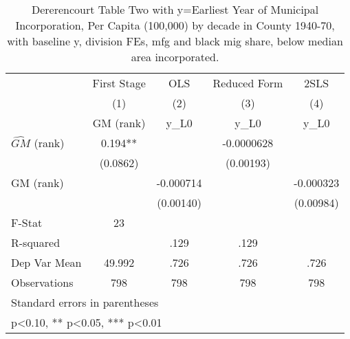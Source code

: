 \begin{table}[htbp]\centering
\def\sym#1{\ifmmode^{#1}\else\(^{#1}\)\fi}
\caption{Dererencourt Table Two with y=Earliest Year of Municipal Incorporation, Per Capita (100,000) by decade in County 1940-70, with baseline y, division FEs, mfg and black mig share, below median area incorporated.}
\begin{tabular}{l*{4}{c}}
\toprule
                    & First Stage   &         OLS   &Reduced Form   &        2SLS   \\
                    &\multicolumn{1}{c}{(1)}&\multicolumn{1}{c}{(2)}&\multicolumn{1}{c}{(3)}&\multicolumn{1}{c}{(4)}\\
                    &\multicolumn{1}{c}{GM  (rank)}&\multicolumn{1}{c}{y\_L0}&\multicolumn{1}{c}{y\_L0}&\multicolumn{1}{c}{y\_L0}\\
\midrule
$\hat{GM}$ (rank)   &       0.194** &               &  -0.0000628   &               \\
                    &    (0.0862)   &               &   (0.00193)   &               \\
\addlinespace
GM  (rank)          &               &   -0.000714   &               &   -0.000323   \\
                    &               &   (0.00140)   &               &   (0.00984)   \\
\midrule
F-Stat              &          23   &               &               &               \\
R-squared           &               &        .129   &        .129   &               \\
Dep Var Mean        &      49.992   &        .726   &        .726   &        .726   \\
Observations        &         798   &         798   &         798   &         798   \\
\bottomrule
\multicolumn{5}{l}{\footnotesize Standard errors in parentheses}\\
\multicolumn{5}{l}{\footnotesize * p<0.10, ** p<0.05, *** p<0.01}\\
\end{tabular}
\end{table}

